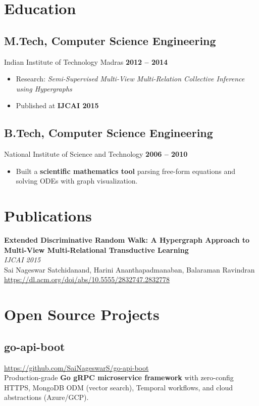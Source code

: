 \documentclass[11pt,letterpaper]{article}
\begin{document}
\section{Education}

\subsection{M.Tech, Computer Science Engineering}
Indian Institute of Technology Madras \hfill \textbf{2012 -- 2014}

\begin{itemize}[leftmargin=*,noitemsep]
    \item Research: \textit{Semi-Supervised Multi-View Multi-Relation Collective Inference using Hypergraphs}
    \item Published at \textbf{IJCAI 2015}
\end{itemize}

\subsection{B.Tech, Computer Science Engineering}
National Institute of Science and Technology \hfill \textbf{2006 -- 2010}

\begin{itemize}[leftmargin=*,noitemsep]
    \item Built a \textbf{scientific mathematics tool} parsing free-form equations and solving ODEs with graph visualization.
\end{itemize}

\section{Publications}

\textbf{Extended Discriminative Random Walk: A Hypergraph Approach to Multi-View Multi-Relational Transductive Learning} \\
\textit{IJCAI 2015} \\
Sai Nageswar Satchidanand, Harini Ananthapadmanaban, Balaraman Ravindran \\
\href{https://dl.acm.org/doi/abs/10.5555/2832747.2832778}{https://dl.acm.org/doi/abs/10.5555/2832747.2832778}

\section{Open Source Projects}

\subsection{go-api-boot}
\href{https://github.com/SaiNageswarS/go-api-boot}{https://github.com/SaiNageswarS/go-api-boot} \\
Production-grade \textbf{Go gRPC microservice framework} with zero-config HTTPS, MongoDB ODM (vector search), Temporal workflows, and cloud abstractions (Azure/GCP).
\end{document}
